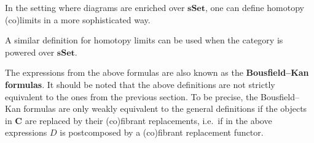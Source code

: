     In the setting where diagrams are enriched over $\mathbf{sSet}$, one can define homotopy (co)limits in a more sophisticated way.

    A similar definition for homotopy limits can be used when the category is powered over $\mathbf{sSet}$.
    \begin{remark}
        The expressions from the above formulas are also known as the \textbf{Bousfield--Kan formulas}. It should be noted that the above definitions are not strictly equivalent to the ones from the previous section. To be precise, the Bousfield--Kan formulas are only weakly equivalent to the general definitions if the objects in $\mathbf{C}$ are replaced by their (co)fibrant replacements, i.e.~if in the above expressions $D$ is postcomposed by a (co)fibrant replacement functor.
    \end{remark}


